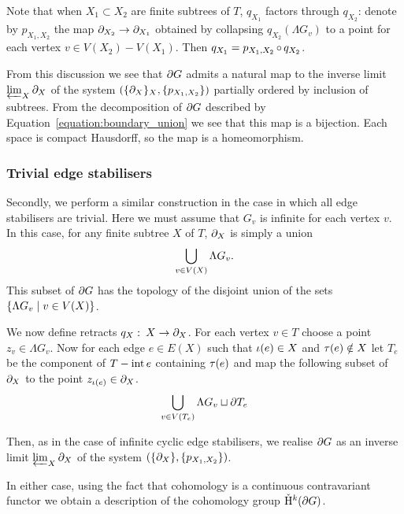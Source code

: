Note that when $X_1 \subset X_2$ are finite subtrees of $T$, $q_{X_1}$ factors through $q_{X_2}$: denote by $p_{X_1,X_2}$ the map $\partial_{X_2} \to \partial_{X_1}$ obtained by collapsing $q_{X_2}(\Lambda G_v)$ to a point for each vertex $v \in V(X_2) - V(X_1)$.
Then $q_{X_1} = p_{X_1, X_2} \operatorname{\circ} q_{X_2}$.

From this discussion we see that $\partial G$ admits a natural map to the inverse limit $\varprojlim_X \partial_X$ of the system $(\{\partial_X\}_X, \{p_{X_1, X_2}\})$ partially ordered by inclusion of subtrees.
From the decomposition of $\partial G$ described by Equation~\ref{equation:boundary_union} we see that this map is a bijection.
Each space is compact Hausdorff, so the map is a homeomorphism.

\subsubsection{Trivial edge stabilisers}

Secondly, we perform a similar construction in the case in which all edge stabilisers are trivial.
Here we must assume that $G_v$ is infinite for each vertex $v$.
In this case, for any finite subtree $X$ of $T$, $\partial_X$ is simply a union
\begin{align}
  \bigcup_{v \in V(X)} \Lambda G_v.
\end{align}
This subset of $\partial G$ has the topology of the disjoint union of the sets $\{\Lambda G_v \mid v \in V(X)\}$.

We now define retracts $q_X \operatorname{\colon} X \to \partial_X$.
For each vertex $v \in T$ choose a point $z_v \in \Lambda G_v$.
Now for each edge $e \in E(X)$ such that $\operatorname{\iota}(e) \in X$ and $\operatorname{\tau}(e) \notin X$ let $T_e$ be the component of $T - \operatorname{int} e$ containing $\operatorname{\tau}(e)$ and map the following subset of $\partial_X$ to the point $z_{\operatorname{\iota}(e)} \in \partial_X$.
\begin{align}
  \bigcup_{v \in V(T_e)} \Lambda G_v \sqcup \partial T_e
\end{align}

Then, as in the case of infinite cyclic edge stabilisers, we realise $\partial G$ as an inverse limit $\varprojlim_X \partial_X$ of the system $(\{\partial_X\}, \{p_{X_1, X_2}\})$.

In either case, using the fact that \vCech{} cohomology is a continuous contravariant functor we obtain a description of the \vCech{} cohomology group $\check{\mathrm{H}}{}^k(\partial G)$.

